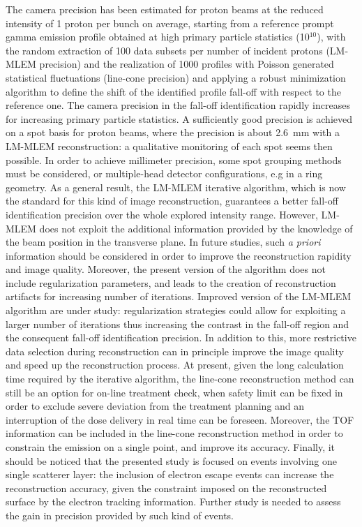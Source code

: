 The camera precision has been estimated for proton beams at the reduced intensity of 1 proton per bunch on average, starting from a reference prompt gamma emission profile obtained at high primary particle statistics (10$^{10}$), with the random extraction of 100 data subsets per number of incident protons (LM-MLEM precision) and the realization of 1000 profiles with Poisson generated statistical fluctuations (line-cone precision) and applying a robust minimization algorithm to define the shift of the identified profile fall-off with respect to the reference one.
The camera precision in the fall-off identification rapidly increases for increasing primary particle statistics. A sufficiently good precision is achieved on a spot basis for proton beams, where the precision is about 2.6~mm with a LM-MLEM reconstruction: a qualitative monitoring of each spot seems then possible. In order to achieve millimeter precision, some spot grouping methods must be considered, or multiple-head detector configurations, e.g in a ring geometry. As a general result, the LM-MLEM iterative algorithm, which is now the standard for this kind of image reconstruction,  guarantees a better fall-off identification precision over the whole explored intensity range. However, LM-MLEM does not exploit the additional information provided by the knowledge of the beam position in the transverse plane. In future studies, such \textit{a priori} information should be considered in order to improve the reconstruction rapidity and image quality. Moreover, the present version of the algorithm does not include regularization parameters, and leads to the creation of reconstruction artifacts for increasing number of iterations. Improved version of the LM-MLEM algorithm are under study: regularization strategies could allow for exploiting a larger number of iterations thus increasing the contrast in the fall-off region and the consequent fall-off identification precision. In addition to this, more restrictive data selection during reconstruction can in principle improve the image quality and speed up the reconstruction process. At present, given the long calculation time required by the iterative algorithm, the line-cone reconstruction method can still be an option for on-line treatment check, when safety limit can be fixed in order to exclude severe deviation from the treatment planning and an interruption of the dose delivery in real time can be foreseen. Moreover, the TOF information can be included in the line-cone reconstruction method in order to constrain the emission on a single point, and improve its accuracy.
Finally, it should be noticed that the presented study is focused on events involving one single scatterer layer: the inclusion of electron escape events can increase the reconstruction accuracy, given the constraint imposed on the reconstructed surface by the electron tracking information. Further study is needed to assess the gain in precision provided by such kind of events. 

